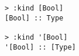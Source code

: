 \begin{repl}\begin{lstlisting}
> :kind [Bool]
[Bool] :: Type

> :kind '[Bool]
'[Bool] :: [Type]\end{lstlisting}\end{repl}
